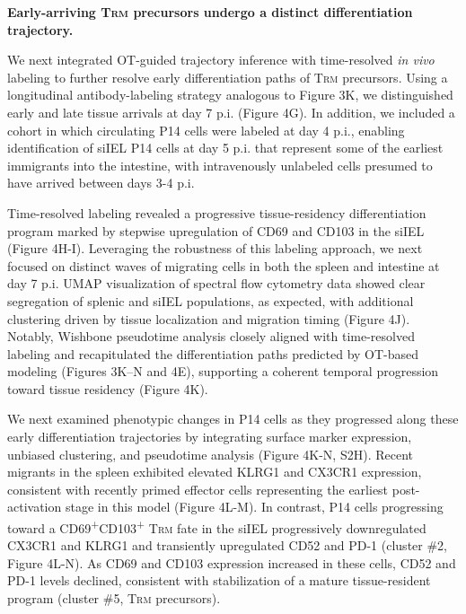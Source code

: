 \textbf{Early-arriving T\textsc{rm} precursors undergo a distinct
differentiation trajectory.}

We next integrated OT-guided trajectory inference with time-resolved
\emph{in vivo} labeling to further resolve early differentiation paths
of T\textsc{rm} precursors. Using a longitudinal antibody-labeling
strategy analogous to Figure 3K, we distinguished early and late tissue
arrivals at day 7 p.i. (Figure 4G). In addition, we included a cohort in
which circulating P14 cells were labeled at day 4 p.i., enabling
identification of siIEL P14 cells at day 5 p.i. that represent some of
the earliest immigrants into the intestine, with intravenously unlabeled
cells presumed to have arrived between days 3-4 p.i.

Time-resolved labeling revealed a progressive tissue-residency
differentiation program marked by stepwise upregulation of CD69 and
CD103 in the siIEL (Figure 4H-I). Leveraging the robustness of this
labeling approach, we next focused on distinct waves of migrating cells
in both the spleen and intestine at day 7 p.i. UMAP visualization of
spectral flow cytometry data showed clear segregation of splenic and
siIEL populations, as expected, with additional clustering driven by
tissue localization and migration timing (Figure 4J). Notably, Wishbone
pseudotime analysis closely aligned with time-resolved labeling and
recapitulated the differentiation paths predicted by OT-based modeling
(Figures 3K--N and 4E), supporting a coherent temporal progression
toward tissue residency (Figure 4K).

We next examined phenotypic changes in P14 cells as they progressed
along these early differentiation trajectories by integrating surface
marker expression, unbiased clustering, and pseudotime analysis (Figure
4K-N, S2H). Recent migrants in the spleen exhibited elevated KLRG1 and
CX3CR1 expression, consistent with recently primed effector cells
representing the earliest post-activation stage in this model (Figure
4L-M). In contrast, P14 cells progressing toward a
CD69\textsuperscript{+}CD103\textsuperscript{+} T\textsc{rm} fate in the
siIEL progressively downregulated CX3CR1 and KLRG1 and transiently
upregulated CD52 and PD-1 (cluster \#2, Figure 4L-N). As CD69 and CD103
expression increased in these cells, CD52 and PD-1 levels declined,
consistent with stabilization of a mature tissue-resident program
(cluster \#5, T\textsc{rm} precursors).

